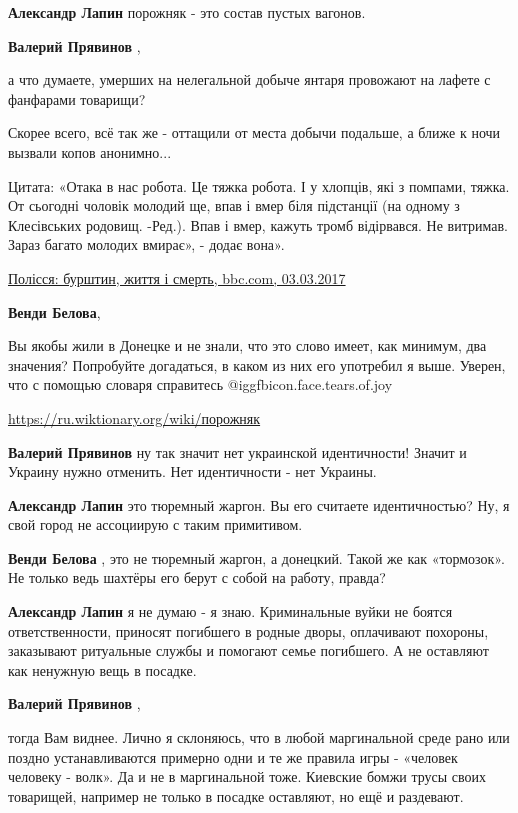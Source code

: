 \begin{itemize}
\begin{itemize}
\textbf{Александр Лапин} порожняк - это состав пустых вагонов.

\textbf{Валерий Прявинов} , 

а что думаете, умерших на нелегальной добыче янтаря провожают на лафете с
фанфарами товарищи?

Скорее всего, всё так же - оттащили от места добычи подальше, а ближе к ночи
вызвали копов анонимно...

Цитата: «Отака в нас робота. Це тяжка робота. І у хлопців, які з помпами,
тяжка. От сьогодні чоловік молодий ще, впав і вмер біля підстанції (на одному з
Клесівських родовищ. -Ред.). Впав і вмер, кажуть тромб відірвався. Не витримав.
Зараз багато молодих вмирає», - додає вона».

\href{https://www.bbc.com/ukrainian/news-39151322}{%
Полісся: бурштин, життя і смерть, bbc.com, 03.03.2017%
}

\textbf{Венди Белова}, 

Вы якобы жили в Донецке и не знали, что это слово имеет, как минимум, два
значения? Попробуйте догадаться, в каком из них его употребил я выше. Уверен,
что с помощью словаря справитесь  @igg{fbicon.face.tears.of.joy} 

\url{https://ru.wiktionary.org/wiki/порожняк}

\textbf{Валерий Прявинов} ну так значит нет украинской идентичности! Значит и Украину нужно отменить. Нет идентичности - нет Украины.

\textbf{Александр Лапин} это тюремный жаргон. Вы его считаете идентичностью? Ну, я свой город не ассоциирую с таким примитивом.

\textbf{Венди Белова} , это не тюремный жаргон, а донецкий. Такой же как «тормозок». Не только ведь шахтёры его берут с собой на работу, правда?

\textbf{Александр Лапин} я не думаю - я знаю. Криминальные вуйки не боятся ответственности, приносят погибшего в родные дворы, оплачивают похороны, заказывают ритуальные службы и помогают семье погибшего. А не оставляют как ненужную вещь в посадке.

\textbf{Валерий Прявинов} , 

тогда Вам виднее. Лично я склоняюсь, что в любой маргинальной среде рано или
поздно устанавливаются примерно одни и те же правила игры - «человек человеку -
волк». Да и не в маргинальной тоже. Киевские бомжи трусы своих товарищей,
например не только в посадке оставляют, но ещё и раздевают.


\end{itemize}
\end{itemize}
